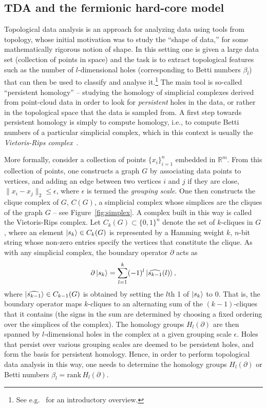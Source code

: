 \documentclass[11pt]{article}
\numberwithin{equation}{section}
\newcommand\equ[1] {\begin{equation}#1\end{equation}}
\renewcommand\( {\left(}
\renewcommand\) {\right)}
\begin{document}
\subsection{TDA and the fermionic hard-core model}\label{sec:TDA_and_fermion_hardcore}
Topological data analysis is an approach for analyzing data using tools from topology, whose initial motivation was to study the ``shape of data,'' for some mathematically rigorous notion of shape. In this setting one is given a large data set (collection of points in space) and the task is to extract topological features such as the number of $l$-dimensional holes (corresponding to Betti numbers $\beta_l$) that can then be used to classify and analyse it.\footnote{See e.g.~\cite{ghrist2008barcodes} for an introductory overview.} The main tool is so-called ``persistent homology'' -- studying the homology of simplicial complexes derived from point-cloud data in order to look for \emph{persistent} holes in the data, or rather in the topological space that the data is sampled from. A first step towards persistent homology is simply to compute homology, i.e., to compute Betti numbers of a particular simplicial complex, which in this context is usually the \emph{Vietoris-Rips complex}~\cite{ghrist2008barcodes}.

More formally, consider a collection of points $\{x_i\}_{i=1}^n$ embedded in $\mathbb{R}^m$. From this collection of points, one constructs a graph $G$ by associating data points to vertices, and adding an edge between two vertices $i$ and $j$ if they are close, $\|x_i - x_j\|_2 \leq \epsilon$, where $\epsilon$ is termed the \emph{grouping scale}. One then constructs the clique complex of $G$, $C(G)$, a simplicial complex whose simplices are the cliques of the graph $G$ -- see Figure~\ref{fig:simplex}. A complex built in this way is called the Vietoris-Rips complex. Let $C_k(G) \subset \{0,1\}^n$ denote the set of $k$-cliques in $G$, where an element $\ket{s_k} \in C_k(G)$ is represented by a Hamming weight $k$, $n$-bit string whose non-zero entries specify the vertices that constitute the clique. As with any simplicial complex, the boundary operator $\partial$ acts  as
\equ{\label{cobdrysimplex}
    \partial \ket{s_k}= \sum_{l=1}^k (-1)^l \ket{\widehat{s_{k-1}}(l)},
}
where $\ket{\widehat{s_{k-1}}}\in C_{k-1}(G)$ is  obtained by setting the $l$th 1 of $\ket{s_k}$ to 0. That is, the boundary operator maps $k$-cliques to an alternating sum of the $(k-1)$-cliques that it contains (the signs in the sum are determined by choosing a fixed ordering over the simplices of the complex). The homology groups $H_l(\partial)$ are then spanned by $l$-dimensional holes in the complex at a given grouping scale $\epsilon$. Holes that persist over various grouping scales are deemed to be persistent holes, and form the basis for persistent homology. Hence, in order to perform topological data analysis in this way, one needs to determine the homology groups $H_l(\partial)$ or Betti numbers $\beta_l=\text{rank}\, H_l(\partial)$. 
\end{document}
